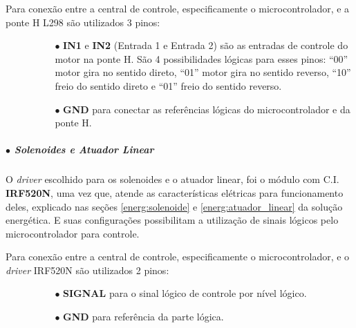    Para conexão entre a central de controle, especificamente o microcontrolador, e a ponte H L298 são utilizados 3 pinos:
    
    \begin{itemize}
        \item[ ]
        \begin{itemize}
            \item[ ]
            \begin{itemize}
                \item[$\bullet$] \textbf{IN1} e \textbf{IN2} (Entrada 1 e Entrada 2) são as entradas de controle do motor na ponte H. São 4 possibilidades lógicas para esses pinos: ``00'' motor gira no sentido direto, ``01'' motor gira no sentido reverso, ``10'' freio do sentido direto e ``01'' freio do sentido reverso.
                \item[$\bullet$] \textbf{GND} para conectar as referências lógicas do microcontrolador e da ponte H.
            \end{itemize}
        \end{itemize}
    \end{itemize}
    
    
    \subparagraph*{ $\bullet$ \textbf{Solenoides e Atuador Linear}}
    
    O \textit{driver} escolhido para os solenoides e o atuador linear, foi o módulo com C.I. \textbf{IRF520N}, uma vez que, atende as características elétricas para funcionamento deles, explicado nas seções \ref{energ:solenoide} e \ref{energ:atuador_linear} da solução energética. E suas configurações possibilitam a utilização de sinais lógicos pelo microcontrolador para controle.
    
    Para conexão entre a central de controle, especificamente o microcontrolador, e o \textit{driver} IRF520N são utilizados 2 pinos:
    
        \begin{itemize}
        \item[ ]
        \begin{itemize}
            \item[ ]
            \begin{itemize}
                \item[$\bullet$] \textbf{SIGNAL} para o sinal lógico de controle por nível lógico.
                \item[$\bullet$] \textbf{GND} para referência da parte lógica.
            \end{itemize}
        \end{itemize}
    \end{itemize}
    
